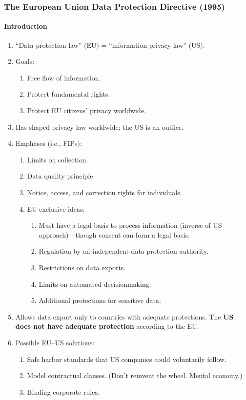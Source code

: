 \subsubsection{The European Union Data Protection Directive (1995)}

\paragraph{Introduction} 

\begin{enumerate}
    \item ``Data protection law'' (EU) = ``information privacy law'' (US).
    \item Goals:
    \begin{enumerate}
        \item Free flow of information.
        \item Protect fundamental rights.
        \item Protect EU citizens' privacy worldwide.
    \end{enumerate}
    \item Has shaped privacy law worldwide; the US is an outlier.
    \item Emphases (i.e., FIPs):
    \begin{enumerate}
        \item Limits on collection.
        \item Data quality principle.
        \item Notice, access, and correction rights for individuals.
        \item EU exclusive ideas:
        \begin{enumerate}
            \item Must have a legal basis to process information (inverse of US 
            approach)---though consent can form a legal basis.
            \item Regulation by an independent data protection authority.
            \item Restrictions on data exports.
            \item Limits on automated decisionmaking.
            \item Additional protections for sensitive data.
        \end{enumerate}
    \end{enumerate}
    \item Allows data export only to countries with adequate protections. The 
    \textbf{US does not have adequate protection} according to the EU.
    \item Possible EU--US solutions:
    \begin{enumerate}
        \item Safe harbor standards that US companies could voluntarily follow.
        \item Model contractual clauses. (Don't reinvent the wheel. Mental 
        economy.)
        \item Binding corporate rules.
    \end{enumerate}
\end{enumerate}

